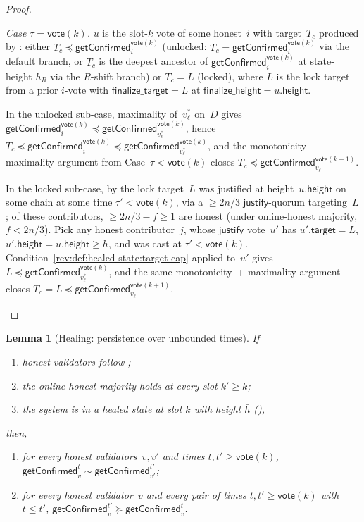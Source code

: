 \ifx\litemode\undefined\documentclass{article}\fi
\newcommand{\target}{\mathsf{target}}
\newcommand{\height}{\mathsf{height}}
\newcommand{\just}{\ensuremath{\mathsf{justify}}\xspace}
\newcommand{\finalizeHeight}{\mathsf{finalize\_height}}
\newcommand{\finalizeTarget}{\mathsf{finalize\_target}}
\newcommand{\vote}{\mathsf{vote}}
\newcommand{\comm}[1]{\bar{#1}}
\newcommand{\getConfirmed}{\textsf{getConfirmed}\xspace}
\theoremstyle{plain}
\newtheorem{lemma}{Lemma}
\theoremstyle{definition}
\theoremstyle{remark}
\newcommand{\OHM}{online-honest majority\xspace}
\begin{document}
\begin{proof}
\begin{itemize}
  \emph{Case $\tau = \vote(k)$.}
  $u$ is the slot-$k$ vote of some honest~$i$ with target~$T_c$ produced by : either $T_c \preceq \getConfirmed_i^{\vote(k)}$ (unlocked: $T_c = \getConfirmed_i^{\vote(k)}$ via the default branch, or $T_c$ is the deepest ancestor of $\getConfirmed_i^{\vote(k)}$ at state-height $h_R$ via the $R$-shift branch) or $T_c = L$ (locked), where $L$ is the lock target from a prior $i$-vote with $\finalizeTarget = L$ at $\finalizeHeight = u.\height$.

  In the unlocked sub-case, maximality of~$v^*_\ell$ on~$D$ gives $\getConfirmed_i^{\vote(k)} \preceq \getConfirmed_{v^*_\ell}^{\vote(k)}$, hence $T_c \preceq \getConfirmed_i^{\vote(k)} \preceq \getConfirmed_{v^*_\ell}^{\vote(k)}$, and the monotonicity~+ maximality argument from Case~$\tau < \vote(k)$ closes $T_c \preceq \getConfirmed_{v_\ell}^{\vote(k+1)}$.

  In the locked sub-case, by  the lock target~$L$ was justified at height~$u.\height$ on some chain at some time $\tau' < \vote(k)$, via a $\geq 2n/3$ \just-quorum targeting~$L$; of these contributors, $\geq 2n/3 - f \geq 1$ are honest (under \OHM, $f < 2n/3$). Pick any honest contributor~$j$, whose \just vote~$u'$ has $u'.\target = L$, $u'.\height = u.\height \geq h$, and was cast at $\tau' < \vote(k)$. Condition~\ref{rev:def:healed-state:target-cap} applied to~$u'$ gives $L \preceq \getConfirmed_{v^*_\ell}^{\vote(k)}$, and the same monotonicity~+ maximality argument closes $T_c = L \preceq \getConfirmed_{v_\ell}^{\vote(k+1)}$.
\end{itemize}
\end{proof}

\begin{lemma}[Healing: persistence over unbounded times]\label{rev:lem:healing-unbounded}
If
\begin{enumerate}
  \item\label{rev:hu:f} honest validators follow ;
  \item\label{rev:hu:ohm} the \OHM holds at every slot $k' \geq k$;
  \item\label{rev:hu:hs} the system is in a healed state at slot $k$ with height $\comm{h}$ (),
\end{enumerate}
then,
\begin{enumerate}
  \item for every honest validators~$v,v'$ and times $t, t' \geq \vote(k)$, $\getConfirmed_v^{t} \sim \getConfirmed_{v'}^{t'}$;
  \item for every honest validator~$v$ and every pair of times $t, t' \geq \vote(k)$ with $t \leq t'$, $\getConfirmed_v^{t'} \succeq \getConfirmed_v^t$.
\end{enumerate}
\end{lemma}
\end{document}
